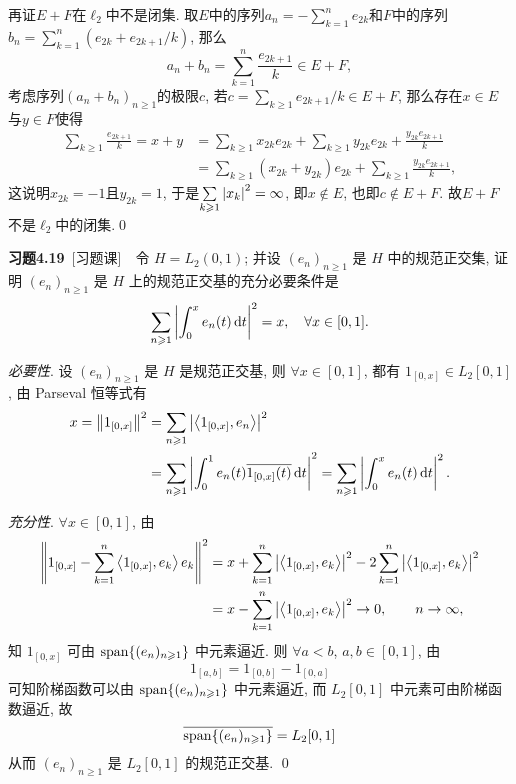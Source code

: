 \begin{Proof}
    再证$ E+F $在$ \ell_2 $中不是闭集. 取$ E $中的序列$ a_n=-\sum\limits_{k=1}^ne_{2k} $和$ F $中的序列$ b_n=\sum\limits_{k=1}^n(e_{2k}+e_{2k+1}/k) $, 那么
    \[
    a_n+b_n=\sum_{k=1}^n\frac{e_{2k+1}}{k}\in E+F,
    \]
    考虑序列$ (a_n+b_n)_{n\geqslant 1} $的极限$ c $, 若$ c=\sum\limits_{k\geqslant 1}e_{2k+1}/k\in E+F $, 那么存在$ x\in E $与$ y\in F $使得
    \[
    \begin{aligned}
    \sum_{k\geqslant 1}\frac{e_{2k+1}}{k}=x+y&=\sum_{k\geqslant 1}x_{2k}e_{2k}+\sum_{k\geqslant 1}y_{2k}e_{2k}+\frac{y_{2k}e_{2k+1}}{k}\\
    &=\sum_{k\geqslant 1}(x_{2k}+y_{2k})e_{2k}+\sum_{k\geqslant 1}\frac{y_{2k}e_{2k+1}}{k},
    \end{aligned}
    \]
    这说明$ x_{2k}=-1 $且$ y_{2k}=1 $, 于是$ \sum\limits_{k\geqslant 1}\left| x_k \right| ^2=\infty $, 即$ x\notin E $, 也即$ c\notin E+F $. 故$ E+F $不是$ \ell_2 $中的闭集.\qed
    \end{Proof}

    \textbf{习题4.19}\ [习题课]\ \ 令 $ H=L_{2}(0, 1) $; 并设 $ (e_{n})_{n\geqslant1} $ 是 $ H $ 中的规范正交集, 证明 $ (e_{n})_{n\geqslant1} $ 是 $ H $ 上的规范正交基的充分必要条件是
    \[
        \sum_{n\geqslant1}\left| \int_{0}^{x}e_{n}(t)\,\mathrm{d} t \right| ^{2} = x, \quad \forall x\in[0, 1].
    \]
    \begin{Proof}
        \textsl{必要性}. 设 $ (e_{n})_{n\geqslant1} $ 是 $ H $ 是规范正交基, 则 $ \forall x\in[0, 1] $, 都有 $ 1_{[0, x]}\in L_{2}[0, 1] $, 由 Parseval 恒等式有
        \[
            \begin{aligned}
                x = \left\| 1_{[0, x]} \right\|^{2} & =\sum_{n\geqslant1}\left| \left\langle 1_{[0, x]}, e_{n} \right\rangle \right| ^{2}\\
                & =\sum_{n\geqslant1}\left| \int_{0}^{1}e_{n}(t)\overline{1_{[0, x]}(t)}\,\mathrm{d} t \right| ^{2}=\sum_{n\geqslant1}\left| \int_{0}^{x}e_{n}(t)\,\mathrm{d} t \right| ^{2}.
            \end{aligned}
        \]

        \textsl{充分性}. $ \forall x\in[0, 1] $, 由
        \[
            \begin{aligned}
                \left\| 1_{[0, x]}-\sum_{k=1}^{n}\left\langle 1_{[0, x]}, e_{k} \right\rangle e_{k} \right\|^{2} & = x+\sum_{k=1}^{n}\left| \left\langle 1_{[0, x]}, e_{k} \right\rangle \right| ^{2}-2\sum_{k=1}^{n}\left| \left\langle 1_{[0, x]}, e_{k} \right\rangle \right| ^{2} \\
            & = x-\sum_{k=1}^{n}\left| \left\langle 1_{[0, x]}, e_{k} \right\rangle \right| ^{2}\to 0,\qquad n\to\infty,
            \end{aligned}
        \]
        知 $ 1_{[0, x]} $ 可由 $ \operatorname{span}\{ (e_{n})_{n\geqslant1} \} $ 中元素逼近. 则 $ \forall a<b $, $ a, b\in[0, 1] $, 由
        \[
            1_{[a, b]} = 1_{[0, b]}-1_{[0, a]}
        \]
        可知阶梯函数可以由 $ \operatorname{span}\{ (e_{n})_{n\geqslant1} \} $ 中元素逼近, 而 $ L_{2}[0, 1] $ 中元素可由阶梯函数逼近, 故
        \[
            \overline{\operatorname{span}\{ (e_{n})_{n\geqslant1} \}}=L_{2}[0, 1]
        \]
        从而 $ (e_{n})_{n\geqslant1} $ 是 $ L_{2}[0, 1] $ 的规范正交基. \qed
    \end{Proof}

